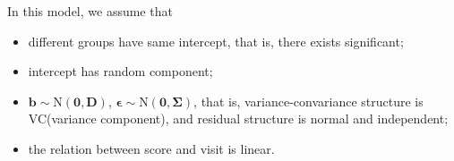 \documentclass[letterpaper, 12pt]{article}
\begin{document}
In this model, we assume that
\begin{itemize}
\item different groups have same intercept, that is, there exists significant;
\item intercept has random component;
\item $\bm{b}\sim\text{N}(\bm{0},\bm{D})$, $\bm{\epsilon}\sim\text{N}(\bm{0},\bm{\Sigma})$, that is, variance-convariance structure is VC(variance component), and residual structure is normal and independent;
\item the relation between score and visit is linear.
\end{itemize}



\end{document}
